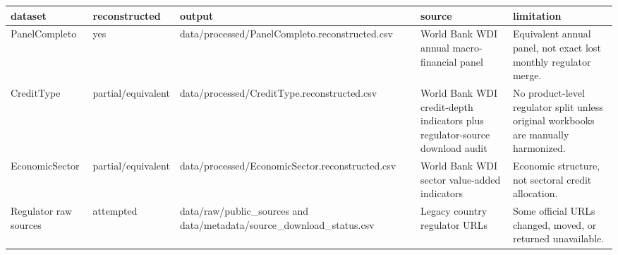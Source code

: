 ﻿%
\begin{tabular}{lllll}
\hline
dataset & reconstructed & output & source & limitation \\
\hline
PanelCompleto & yes & data/processed/PanelCompleto.reconstructed.csv & World Bank WDI annual macro-financial panel & Equivalent annual panel, not exact lost monthly regulator merge. \\
CreditType & partial/equivalent & data/processed/CreditType.reconstructed.csv & World Bank WDI credit-depth indicators plus regulator-source download audit & No product-level regulator split unless original workbooks are manually harmonized. \\
EconomicSector & partial/equivalent & data/processed/EconomicSector.reconstructed.csv & World Bank WDI sector value-added indicators & Economic structure, not sectoral credit allocation. \\
Regulator raw sources & attempted & data/raw/public\_sources and data/metadata/source\_download\_status.csv & Legacy country regulator URLs & Some official URLs changed, moved, or returned unavailable. \\
\hline
\end{tabular}

